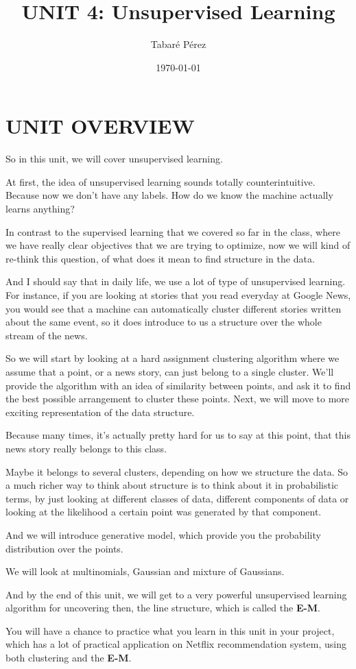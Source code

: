 \documentclass[a4paper, 12pt]{article}
\author{Tabaré Pérez}
\date{\today}
\title{UNIT 4: Unsupervised Learning}
\begin{document}
\maketitle
\section*{UNIT OVERVIEW}
\label{sec:orgfb07a6c}
So in this unit, we will cover unsupervised learning.

At first, the idea of unsupervised learning sounds totally counterintuitive.
Because now we don't have any labels. How do we know the machine actually learns
anything?

In contrast to the supervised learning that we covered so far in the class,
where we have really clear objectives that we are trying to optimize, now we
will kind of re-think this question, of what does it mean to find structure in
the data.

And I should say that in daily life, we use a lot of type of unsupervised
learning. For instance, if you are looking at stories that you read everyday at
Google News, you would see that a machine can automatically cluster different
stories written about the same event, so it does introduce to us a structure
over the whole stream of the news.

So we will start by looking at a hard assignment clustering algorithm where we assume that a point, or a news story, can just belong to a single
cluster. We'll provide the algorithm with an idea of similarity between points,
and ask it to find the best possible arrangement to cluster these points. Next,
we will move to more exciting representation of the data structure.

Because many times, it's actually pretty hard for us to say at this point, that
this news story really belongs to this class.

Maybe it belongs to several clusters, depending on how we structure
the data. So a much richer way to think about structure is to think about it in
probabilistic terms, by just looking at different classes of data, different
components of data or looking at the likelihood a certain point was generated by
that component.

And we will introduce generative model, which provide you the probability
distribution over the points.

We will look at multinomials, Gaussian and mixture of Gaussians.

And by the end of this unit, we will get to a very powerful unsupervised
learning algorithm for uncovering then, the line structure, which is called the
\textbf{E-M}.

You will have a chance to practice what you learn in this unit in your project,
which has a lot of practical application on Netflix recommendation system, using
both clustering and the \textbf{E-M}.
\end{document}
